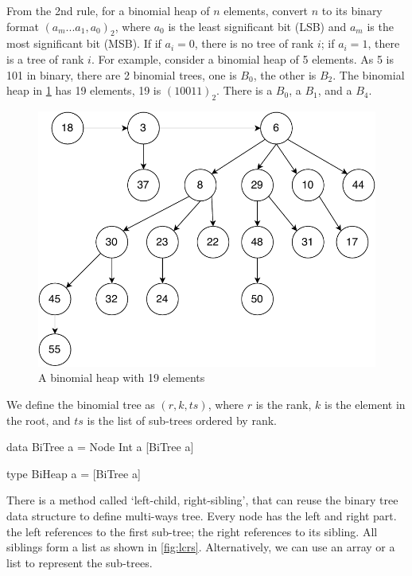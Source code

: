 \documentclass[b5paper]{article}
\begin{document}
From the 2nd rule, for a binomial heap of $n$ elements, convert $n$ to its binary format $(a_m ... a_1, a_0)_2$, where $a_0$ is the least significant bit (LSB) and $a_m$ is the most significant bit (MSB). If if $a_i=0$, there is no tree of rank $i$; if $a_i = 1$, there is a tree of rank $i$. For example, consider a binomial heap of 5 elements. As 5 is 101 in binary, there are 2 binomial trees, one is $B_0$, the other is $B_2$. The binomial heap in \cref{fig:bheap2} has 19 elements, 19 is $(10011)_2$. There is a $B_0$, a $B_1$, and a $B_4$.

\begin{figure}[htbp]
  \centering
  \includegraphics[scale=0.5]{img/binomial-heap}
  \caption{A binomial heap with 19 elements}
  \label{fig:bheap2}
\end{figure}

We define the binomial tree as $(r, k, ts)$, where $r$ is the rank, $k$ is the element in the root, and $ts$ is the list of sub-trees ordered by rank.

\lstset{frame=single}
\begin{Haskell}
data BiTree a = Node Int a [BiTree a]

type BiHeap a = [BiTree a]
\end{Haskell}

There is a method called `left-child, right-sibling'\cite{CLRS}, that can reuse the binary tree data structure to define multi-ways tree. Every node has the left and right part. the left references to the first sub-tree; the right references to its sibling. All siblings form a list as shown in \cref{fig:lcrs}. Alternatively, we can use an array or a list to represent the sub-trees.
\end{document}
